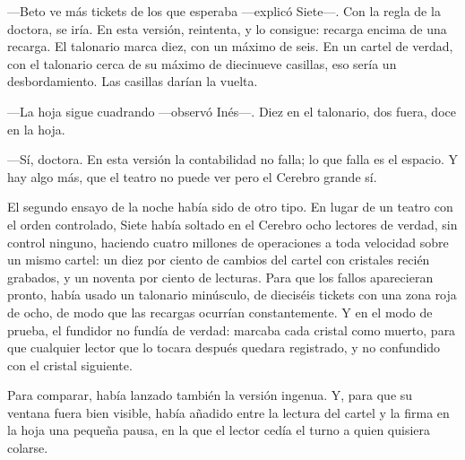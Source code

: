 ---Beto ve más tickets de los que esperaba ---explicó Siete---\nobreak. Con la regla de la doctora, se iría. En esta versión, reintenta, y lo consigue: recarga encima de una recarga. El talonario marca diez, con un máximo de seis. En un cartel de verdad, con el talonario cerca de su máximo de diecinueve casillas, eso sería un desbordamiento. Las casillas darían la vuelta.

---La hoja sigue cuadrando ---observó Inés---\nobreak. Diez en el talonario, dos fuera, doce en la hoja.

---Sí, doctora. En esta versión la contabilidad no falla; lo que falla es el espacio. Y hay algo más, que el teatro no puede ver pero el Cerebro grande sí.

\escena
El segundo ensayo de la noche había sido de otro tipo. En lugar de un teatro con el orden controlado, Siete había soltado en el Cerebro ocho lectores de verdad, sin control ninguno, haciendo cuatro millones de operaciones a toda velocidad sobre un mismo cartel: un diez por ciento de cambios del cartel con cristales recién grabados, y un noventa por ciento de lecturas. Para que los fallos aparecieran pronto, había usado un talonario minúsculo, de dieciséis tickets con una zona roja de ocho, de modo que las recargas ocurrían constantemente. Y en el modo de prueba, el fundidor no fundía de verdad: marcaba cada cristal como muerto, para que cualquier lector que lo tocara después quedara registrado, y no confundido con el cristal siguiente.

Para comparar, había lanzado también la versión ingenua. Y, para que su ventana fuera bien visible, había añadido entre la lectura del cartel y la firma en la hoja una pequeña pausa, en la que el lector cedía el turno a quien quisiera colarse.

\begin{documento}
\end{documento}


